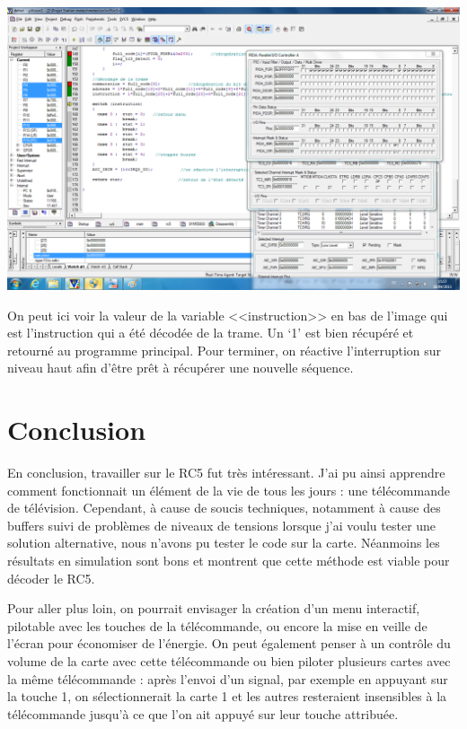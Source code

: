 \documentclass[a4paper]{report}
\begin{document}
\begin{center}
	\includegraphics[scale=0.3]{images/RC_simu7.png}
\end{center}

On peut ici voir la valeur de la variable <<instruction>> en bas de l’image qui est l’instruction qui a été décodée de la trame.
Un ‘1’ est bien récupéré et retourné au programme principal.
Pour terminer, on réactive l’interruption sur niveau haut afin d’être prêt à récupérer une nouvelle séquence.

\section{Conclusion}
En conclusion, travailler sur le RC5 fut très intéressant.
J’ai pu ainsi apprendre comment fonctionnait un élément de la vie de tous les jours : une télécommande de télévision.
Cependant, à cause de soucis techniques, notamment à cause des buffers suivi de problèmes de niveaux de tensions lorsque j’ai voulu tester une solution alternative, nous n’avons pu tester le code sur la carte.
Néanmoins les résultats en simulation sont bons et montrent que cette méthode est viable pour décoder le RC5.

Pour aller plus loin, on pourrait envisager la création d’un menu interactif, pilotable avec les touches de la télécommande, ou encore la mise en veille de l’écran pour économiser de l’énergie.
On peut également penser à un contrôle du volume de la carte avec cette télécommande ou bien piloter plusieurs cartes avec la même télécommande :
après l’envoi d’un signal, par exemple en appuyant sur la touche 1, on sélectionnerait la carte 1 et les autres resteraient insensibles à la télécommande jusqu’à ce que l’on ait appuyé sur leur touche attribuée.
\end{document}

